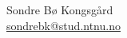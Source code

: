 \begin{flushright}Sondre Bø Kongsgård \\ {\ttfamily \href{mailto:sondrebk@stud.ntnu.no}{sondrebk@stud.ntnu.no}}\end{flushright}
